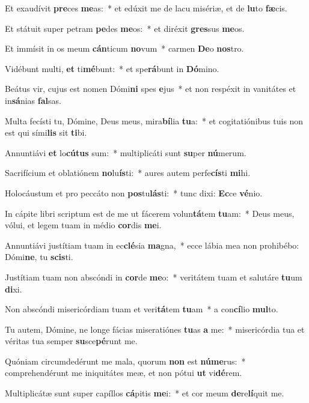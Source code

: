 \item Et exaudívit \textbf{pre}ces \textbf{me}as:~* et edúxit me de lacu misériæ, et de \textbf{lu}to \textbf{fæ}cis.
\item Et státuit super petram \textbf{pe}des \textbf{me}os:~* et diréxit \textbf{gres}sus \textbf{me}os.
\item Et immísit in os meum \textbf{cán}ticum \textbf{no}vum~* carmen \textbf{De}o \textbf{nos}tro.
\item Vidébunt multi, \textbf{et} ti\textbf{mé}bunt:~* et spe\textbf{rá}bunt in \textbf{Dó}mino.
\item Beátus vir, cujus est nomen Dómi\textbf{ni} spes \textbf{e}jus~* et non respéxit in vanitátes et in\textbf{sá}nias \textbf{fal}sas.
\item Multa fecísti tu, Dómine, Deus meus, mira\textbf{bí}lia \textbf{tu}a:~* et cogitatiónibus tuis non est qui sími\textbf{lis} sit \textbf{ti}bi.
\item Annuntiávi \textbf{et} lo\textbf{cú}\textbf{tus} sum:~* multiplicáti sunt \textbf{su}per \textbf{nú}merum.
\item Sacrifícium et oblatiónem \textbf{no}lu\textbf{ís}ti:~* aures autem perfe\textbf{cís}ti \textbf{mi}hi.
\item Holocáustum et pro peccáto non \textbf{pos}tu\textbf{lás}ti:~* tunc dixi: \textbf{Ec}ce \textbf{vé}nio.
\item In cápite libri scriptum est de me ut fácerem volun\textbf{tá}tem \textbf{tu}am:~* Deus meus, vólui, et legem tuam in médio \textbf{cor}dis \textbf{me}i.
\item Annuntiávi justítiam tuam in ec\textbf{clé}sia \textbf{ma}gna,~* ecce lábia mea non prohibébo: Dómi\textbf{ne}, tu \textbf{scis}ti.
\item Justítiam tuam non abscóndi in \textbf{cor}de \textbf{me}o:~* veritátem tuam et salutáre \textbf{tu}um \textbf{di}xi.
\item Non abscóndi misericórdiam tuam et veri\textbf{tá}tem \textbf{tu}am~* a con\textbf{cí}lio \textbf{mul}to.
\item Tu autem, Dómine, ne longe fácias miseratiónes \textbf{tu}as \textbf{a} me:~* misericórdia tua et véritas tua semper \textbf{su}sce\textbf{pé}runt me.
\item Quóniam circumdedérunt me mala, quorum \textbf{non} est \textbf{nú}\textbf{me}rus:~* comprehendérunt me iniquitátes meæ, et non pótui \textbf{ut} vi\textbf{dé}rem.
\item Multiplicátæ sunt super capíllos \textbf{cá}pitis \textbf{me}i:~* et cor meum \textbf{de}re\textbf{lí}quit me.
